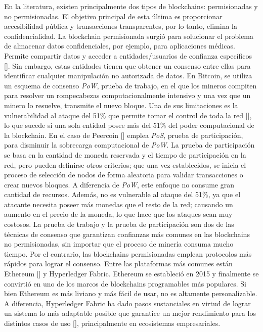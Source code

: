 En la literatura, existen principalmente dos tipos de blockchains: permisionadas y no permisionadas. El objetivo principal de esta \'ultima es proporcionar accesibilidad p\'ublica y transacciones transparentes, por lo tanto, elimina la confidencialidad. La blockchain permisionada surgi\'o para solucionar el problema de almacenar datos confidenciales, por ejemplo, para aplicaciones m\'edicas. Permite compartir datos y acceder a entidades/usuarios de confianza espec\'ificos [\cite{xu2017taxonomy}]. Sin embargo, estas entidades tienen que obtener un consenso entre ellas para identificar cualquier manipulaci\'on no autorizada de datos. En Bitcoin, se utiliza un esquema de consenso \emph{PoW}, prueba de trabajo, en el que los mineros compiten para resolver un rompecabezas computacionalmente intensivo y una vez que un minero lo resuelve, transmite el nuevo bloque. Una de sus limitaciones es la vulnerabilidad al ataque del 51$\%$ que permite tomar el control de toda la red [\cite{narayanan2016bitcoin}], lo que sucede si una sola entidad posee m\'as del 51$\%$ del poder computacional de la blockchain. En el caso de Peercoin [\cite{king2012ppcoin}] emplea \emph{PoS}, prueba de participaci\'on, para disminuir la sobrecarga computacional de \emph{PoW}. La prueba de participaci\'on se basa en la cantidad de moneda reservada y el tiempo de participaci\'on en la red, pero pueden definirse otros criterios; que una vez establecidos, se inicia el proceso de selecci\'on de nodos de forma aleatoria para validar transacciones o crear nuevos bloques. A diferencia de \emph{PoW}, este enfoque no consume gran cantidad de recursos. Adem\'as, no es vulnerable al ataque del 51$\%$, ya que el atacante necesita poseer m\'as monedas que el resto de la red; causando un aumento en el precio de la moneda, lo que hace que los ataques sean muy costosos. La prueba de trabajo y la prueba de participaci\'on son dos de las t\'ecnicas de consenso que garantizan confianzas m\'as comunes en las blockchains no permisionadas, sin importar que el proceso de miner\'ia consuma mucho tiempo. Por el contrario, las blockchains permisionadas emplean protocolos m\'as r\'apidos para lograr el consenso. Entre las plataformas m\'as comunes est\'an Ethereum [\cite{antonopoulos2018mastering}] y Hyperledger Fabric. Ethereum se estableci\'o en 2015 y finalmente se convirti\'o en uno de los marcos de blockchains programables m\'as populares. Si bien Ethereum es m\'as liviano y m\'as f\'acil de usar, no es altamente personalizable. A diferencia, Hyperledger Fabric ha dado pasos sustanciales en virtud de lograr un sistema lo m\'as adaptable posible que garantice un mejor rendimiento para los distintos casos de uso [\cite{valenta2017comparison}], principalmente en ecosistemas empresariales.


